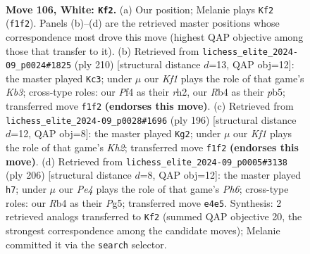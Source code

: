 \documentclass[11pt]{article}
\begin{document}
\clearpage

\begin{figure}[p]\centering
\begin{subfigure}{0.46\textwidth}\centering
\resizebox{\linewidth}{!}{%
\newchessgame
\chessboard[
  setfen={r7/3k4/4p1R1/8/1R2PP2/8/8/5K2 w - - 3 106},
  showmover=false,
  pgfstyle=straightmove, color=movearrow, markmove={f1-f2}
]}
\caption{}
\end{subfigure}\hfill
\begin{subfigure}{0.46\textwidth}\centering
\resizebox{\linewidth}{!}{%
\newchessgame
\chessboard[
  setfen={8/8/5k2/1p4pR/8/1K5P/7r/8 w - - 12 106},
  showmover=false,
  pgfstyle=straightmove, color=movearrow, markmove={b3-c3}
]}
\caption{}
\end{subfigure}
\\[4pt]
\begin{subfigure}{0.46\textwidth}\centering
\resizebox{\linewidth}{!}{%
\newchessgame
\chessboard[
  setfen={8/8/7k/R6p/7P/6P1/7K/2r5 w - - 74 99},
  showmover=false,
  pgfstyle=straightmove, color=movearrow, markmove={h2-g2}
]}
\caption{}
\end{subfigure}\hfill
\begin{subfigure}{0.46\textwidth}\centering
\resizebox{\linewidth}{!}{%
\newchessgame
\chessboard[
  setfen={8/4R3/6pP/6P1/3k4/4p1K1/8/5r2 w - - 2 104},
  showmover=false,
  pgfstyle=straightmove, color=movearrow, markmove={h6-h7}
]}
\caption{}
\end{subfigure}
\caption{\textbf{Move 106, White: \texttt{Kf2}.} (a) Our position; Melanie plays \texttt{Kf2} (\texttt{f1f2}). Panels (b)--(d) are the retrieved master positions whose correspondence most drove this move (highest QAP objective among those that transfer to it). (b) Retrieved from \texttt{lichess\_elite\_2024-09\_p0024\#1825} (ply 210) [structural distance $d$=13, QAP obj=12]: the master played \texttt{Kc3}; under $\mu$ our \emph{Kf1} plays the role of that game's \emph{Kb3}; cross-type roles: our \emph{P}f4 as their \emph{r}h2, our \emph{R}b4 as their \emph{p}b5; transferred move \texttt{f1f2} \textbf{(endorses this move)}. (c) Retrieved from \texttt{lichess\_elite\_2024-09\_p0028\#1696} (ply 196) [structural distance $d$=12, QAP obj=8]: the master played \texttt{Kg2}; under $\mu$ our \emph{Kf1} plays the role of that game's \emph{Kh2}; transferred move \texttt{f1f2} \textbf{(endorses this move)}. (d) Retrieved from \texttt{lichess\_elite\_2024-09\_p0005\#3138} (ply 206) [structural distance $d$=8, QAP obj=12]: the master played \texttt{h7}; under $\mu$ our \emph{Pe4} plays the role of that game's \emph{Ph6}; cross-type roles: our \emph{R}b4 as their \emph{P}g5; transferred move \texttt{e4e5}. Synthesis: 2 retrieved analogs transferred to \texttt{Kf2} (summed QAP objective 20, the strongest correspondence among the candidate moves); Melanie committed it via the \texttt{search} selector.}
\label{fig:thought-m210}
\end{figure}
\end{document}
